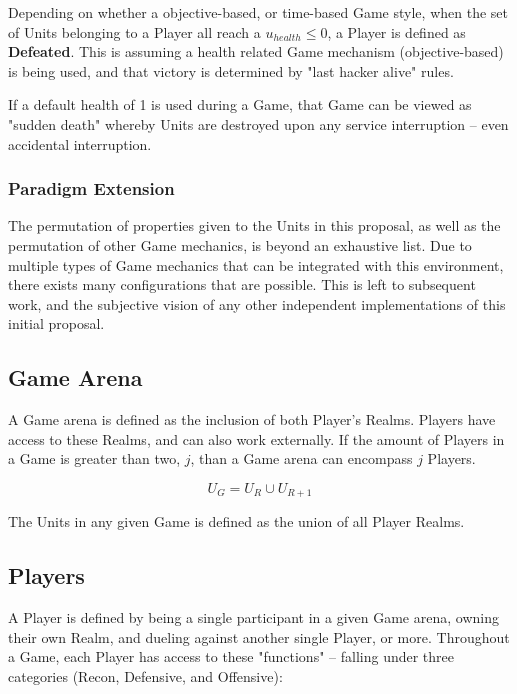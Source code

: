 \documentclass[10pt, titlepage, twocolumn]{article}
\newcommand{\ii}{\indent\indent}
\begin{document}
Depending on whether a objective-based, or time-based Game style, when the set of Units belonging to a Player all reach a \(u_{health} \le 0\), a Player is defined as \textbf{Defeated}. This is assuming a health related Game mechanism (objective-based) is being used, and that victory is determined by "last hacker alive" rules.

If a default health of 1 is used during a Game, that Game can be viewed as "sudden death" whereby Units are destroyed upon any service interruption -- even accidental interruption.

\subsubsection{Paradigm Extension}
\ii
The permutation of properties given to the Units in this proposal, as well as the permutation of other Game mechanics, is beyond an exhaustive list. Due to multiple types of Game mechanics that can be integrated with this environment, there exists many configurations that are possible. This is left to subsequent work, and the subjective vision of any other independent implementations of this initial proposal.


\subsection{Game Arena}
\ii
A Game arena is defined as the inclusion of both Player's Realms. Players have access to these Realms, and can also work externally. If the amount of Players in a Game is greater than two, \(j\), than a Game arena can encompass \(j\) Players.

\begin{equation}\label{unitsrealm}
U_G = U_R \cup U_{R+1} 
\end{equation}

The Units in any given Game is defined as the union of all Player Realms.

\subsection{Players}
\ii
A Player is defined by being a single participant in a given Game arena, owning their own Realm, and dueling against another single Player, or more. Throughout a Game, each Player has access to these "functions" -- falling under three categories (Recon, Defensive, and Offensive):
\end{document}
